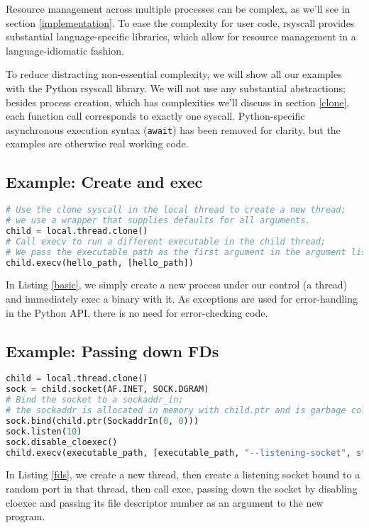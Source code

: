 \documentclass{acmart}
\begin{document}
Resource management across multiple processes can be complex,
as we'll see in section \ref{implementation}.
To ease the complexity for user code,
rsyscall provides substantial language-specific libraries,
which allow for resource management in a language-idiomatic fashion.

To reduce distracting non-essential complexity,
we will show all our examples with the Python rsyscall library.
We will not use any substantial abstractions;
besides process creation, which has complexities we'll discuss in section \ref{clone},
each function call corresponds to exactly one syscall.
Python-specific asynchronous execution syntax (\texttt{await}) has been removed for clarity,
but the examples are otherwise real working code.

\subsection{Example: Create and exec}
\begin{lstlisting}[float,language=Python,label={basic},caption={Creating a new process and immediately execing}]
# Use the clone syscall in the local thread to create a new thread;
# we use a wrapper that supplies defaults for all arguments.
child = local.thread.clone()
# Call execv to run a different executable in the child thread;
# We pass the executable path as the first argument in the argument list, as is traditional.
child.execv(hello_path, [hello_path])
\end{lstlisting}
In Listing \ref{basic}, we simply create a new process under our control (a thread)
and immediately exec a binary with it.
As exceptions are used for error-handling in the Python API,
there is no need for error-checking code.
\subsection{Example: Passing down FDs}
\begin{lstlisting}[float,language=Python,label={fds},caption={Passing down FDs}]
child = local.thread.clone()
sock = child.socket(AF.INET, SOCK.DGRAM)
# Bind the socket to a sockaddr_in;
# the sockaddr is allocated in memory with child.ptr and is garbage collected.
sock.bind(child.ptr(SockaddrIn(0, 0)))
sock.listen(10)
sock.disable_cloexec()
child.execv(executable_path, [executable_path, "--listening-socket", str(int(sock))])
\end{lstlisting}
In Listing \ref{fds}, we create a new thread,
then create a listening socket bound to a random port in that thread,
then call exec, 
passing down the socket by disabling cloexec and passing its file descriptor number as an argument to the new program.
\end{document}
